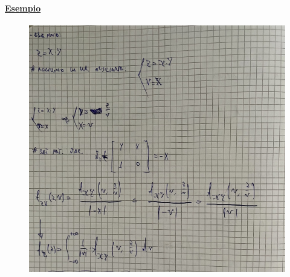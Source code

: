 \documentclass{article}
\begin{document}
\paragraph{\underline{Esempio}}
\begin{figure}[ht]
\centering
\includegraphics[scale=0.16]{ese/49.jpeg}
\end{figure} 
\end{document}
